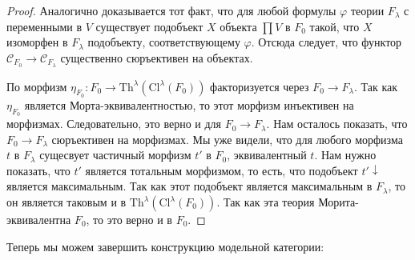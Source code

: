 \documentclass[reqno]{amsart}
\theoremstyle{definition}
\theoremstyle{remark}
\newcommand{\cat}[1]{\mathcal{#1}}
\newcommand{\fs}[1]{\mathrm{#1}}
\begin{document}
\begin{proof}
Аналогично доказывается тот факт, что для любой формулы $\varphi$ теории $F_\lambda$ с переменными в $V$ существует подобъект $X$ объекта $\prod V$ в $F_0$ такой, что $X$ изоморфен в $F_\lambda$ подобъекту, соответствующему $\varphi$.
Отсюда следует, что функтор $\cat{C}_{F_0} \to \cat{C}_{F_\lambda}$ существенно сюръективен на объектах.

По  морфизм $\eta_{F_0} : F_0 \to \fs{Th}^\lambda(\fs{Cl}^\lambda(F_0))$ факторизуется через $F_0 \to F_\lambda$.
Так как $\eta_{F_0}$ является Морта-эквивалентностью, то этот морфизм инъективен на морфизмах.
Следовательно, это верно и для $F_0 \to F_\lambda$.
Нам осталось показать, что $F_0 \to F_\lambda$ сюръективен на морфизмах.
Мы уже видели, что для любого морфизма $t$ в $F_\lambda$ сущесвует частичный морфизм $t'$ в $F_0$, эквивалентный $t$.
Нам нужно показать, что $t'$ является тотальным морфизмом, то есть, что подобъект $t'\!\downarrow$ является максимальным.
Так как этот подобъект является максимальным в $F_\lambda$, то он является таковым и в $\fs{Th}^\lambda(\fs{Cl}^\lambda(F_0))$.
Так как эта теория Морита-эквивалентна $F_0$, то это верно и в $F_0$.
\end{proof}

Теперь мы можем завершить конструкцию модельной категории:
\end{document}
